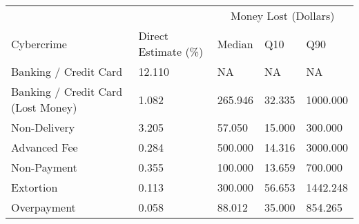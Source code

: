 \captionsetup[table]{labelformat=empty,skip=1pt}
\begin{longtable}{lllll}
\toprule
& & \multicolumn{3}{c}{Money Lost (Dollars)} \\ 
 \cmidrule(lr){3-5}
Cybercrime & Direct Estimate (\%) & Median & Q10 & Q90 \\ 
\midrule
Banking / Credit Card & 12.110 & NA & NA & NA \\ 
Banking / Credit Card (Lost Money) & 1.082 & 265.946 & 32.335 & 1000.000 \\ 
Non-Delivery & 3.205 & 57.050 & 15.000 & 300.000 \\ 
Advanced Fee & 0.284 & 500.000 & 14.316 & 3000.000 \\ 
Non-Payment & 0.355 & 100.000 & 13.659 & 700.000 \\ 
Extortion & 0.113 & 300.000 & 56.653 & 1442.248 \\ 
Overpayment & 0.058 & 88.012 & 35.000 & 854.265 \\ 
\bottomrule
\end{longtable}

